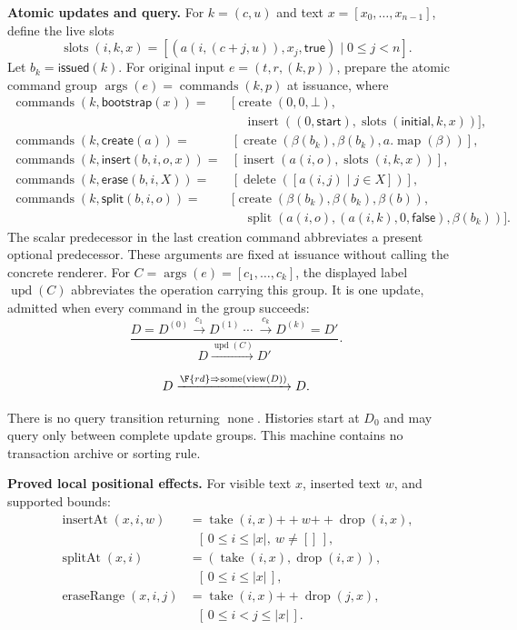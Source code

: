 \textbf{Atomic updates and query.}
For $k=(c,u)$ and text $x=[x_0,\ldots,x_{n-1}]$, define the live slots
\[
\operatorname{slots}(i,k,x)=
 [(a(i,(c+j,u)),x_j,\mathsf{true})\mid0\le j<n].
\]
Let $b_k=\mathsf{issued}(k)$. For original input
$e=(t,r,(k,p))$, prepare the atomic command group
$\operatorname{args}(e)=\operatorname{commands}(k,p)$ at issuance, where
\[
\begin{aligned}
\operatorname{commands}(k,\mathsf{bootstrap}(x))={}&
 [\operatorname{create}(0,0,\bot),\\
 &\quad\operatorname{insert}((0,\mathsf{start}),
                   \operatorname{slots}(\mathsf{initial},k,x))],\\
\operatorname{commands}(k,\mathsf{create}(a))={}&
 [\operatorname{create}(\beta(b_k),\beta(b_k),a.\operatorname{map}(\beta))],\\
\operatorname{commands}(k,\mathsf{insert}(b,i,o,x))={}&
 [\operatorname{insert}(a(i,o),\operatorname{slots}(i,k,x))],\\
\operatorname{commands}(k,\mathsf{erase}(b,i,X))={}&
 [\operatorname{delete}([a(i,j)\mid j\in X])],\\
\operatorname{commands}(k,\mathsf{split}(b,i,o))={}&
 [\operatorname{create}(\beta(b_k),\beta(b_k),\beta(b)),\\
 &\quad\operatorname{split}(a(i,o),(a(i,k),0,\mathsf{false}),\beta(b_k))].
\end{aligned}
\]
The scalar predecessor in the last creation command abbreviates a present
optional predecessor. These arguments are fixed at issuance without calling
the concrete renderer. For $C=\operatorname{args}(e)=[c_1,\ldots,c_k]$,
the displayed label $\operatorname{upd}(C)$ abbreviates the operation
carrying this group. It is one update, admitted when every command in the
group succeeds:
\[
\frac{D=D^{(0)}\xrightarrow{c_1}D^{(1)}\ \cdots\ \xrightarrow{c_k}D^{(k)}=D'}
{D\xrightarrow{\operatorname{upd}(C)}D'}.
\]

\[
D\xrightarrow{\F{rd}\Rightarrow\operatorname{some}(\operatorname{view}(D))}D.
\]

There is no query transition returning $\operatorname{none}$. Histories start at $D_0$ and may query only between complete update groups. This machine contains no transaction archive or sorting rule.

\textbf{Proved local positional effects.} For visible text $x$, inserted text $w$, and supported bounds:
\[
\begin{aligned}
\operatorname{insertAt}(x,i,w)&=\operatorname{take}(i,x)\mathbin{+\!+}w\mathbin{+\!+}\operatorname{drop}(i,x),\\
&\hspace{8pt}[\,0\le i\le |x|,\ w\ne[]\,],\\
\operatorname{splitAt}(x,i)&=(\operatorname{take}(i,x),\operatorname{drop}(i,x)),\\
&\hspace{8pt}[\,0\le i\le |x|\,],\\
\operatorname{eraseRange}(x,i,j)&=\operatorname{take}(i,x)\mathbin{+\!+}\operatorname{drop}(j,x),\\
&\hspace{8pt}[\,0\le i<j\le |x|\,].
\end{aligned}
\]


